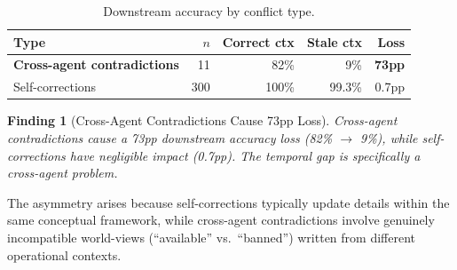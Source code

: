 \documentclass{article}
\newtheorem{finding}{Finding}
\begin{document}
\begin{table}[h]
\centering
\caption{Downstream accuracy by conflict type.}
\begin{tabular}{lrrrr}
\toprule
Type & $n$ & Correct ctx & Stale ctx & Loss \\
\midrule
\textbf{Cross-agent contradictions} & 11 & 82\% & 9\% & \textbf{73pp} \\
Self-corrections & 300 & 100\% & 99.3\% & 0.7pp \\
\bottomrule
\end{tabular}
\label{tab:asymmetry}
\end{table}

\begin{finding}[Cross-Agent Contradictions Cause 73pp Loss]
Cross-agent contradictions cause a 73pp downstream accuracy loss (82\% $\to$ 9\%), while self-corrections have negligible impact (0.7pp). The temporal gap is specifically a \emph{cross-agent} problem.
\end{finding}

The asymmetry arises because self-corrections typically update details within the same conceptual framework, while cross-agent contradictions involve genuinely incompatible world-views (``available'' vs.\ ``banned'') written from different operational contexts.
\end{document}
